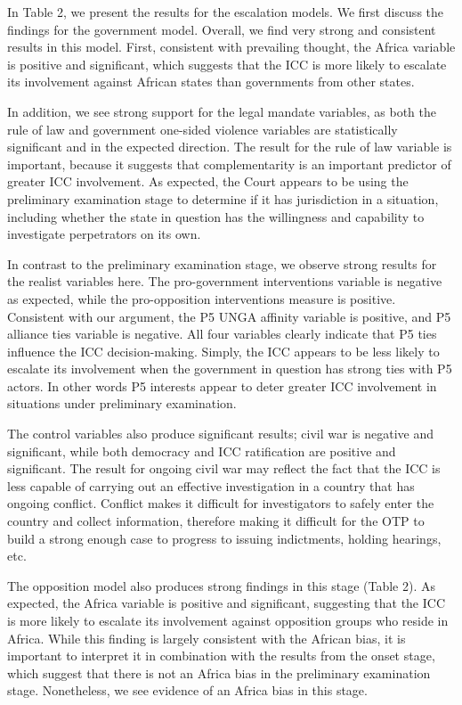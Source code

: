 In Table 2, we present the results for the escalation models. We first discuss the findings for the government model.  Overall, we find very strong and consistent results in this model.  First, consistent with prevailing thought, the Africa variable is positive and significant, which suggests that the ICC is more likely to escalate its involvement against African states than governments from other states. 

In addition, we see strong support for the legal mandate variables, as both the rule of law and government one-sided violence variables are statistically significant and in the expected direction. The result for the rule of law variable is important, because it suggests that complementarity is an important predictor of greater ICC involvement. As expected, the Court appears to be using the preliminary examination stage to determine if it has jurisdiction in a situation, including whether the state in question has the willingness and capability to investigate perpetrators on its own. 

In contrast to the preliminary examination stage, we observe strong results for the realist variables here.  The pro-government interventions variable is negative as expected, while the pro-opposition interventions measure is positive.  Consistent with our argument, the P5 UNGA affinity variable is positive, and P5 alliance ties variable is negative. All four variables clearly indicate that P5 ties influence the ICC decision-making.  Simply, the ICC appears to be less likely to escalate its involvement when the government in question has strong ties with P5 actors.  In other words P5 interests appear to deter greater ICC involvement in situations under preliminary examination. 

The control variables also produce significant results; civil war is negative and significant, while both democracy and ICC ratification are positive and significant. The result for ongoing civil war may reflect the fact that the ICC is less capable of carrying out an effective investigation in a country that has ongoing conflict.  Conflict makes it difficult for investigators to safely enter the country and collect information, therefore making it difficult for the OTP to build a strong enough case to progress to issuing indictments, holding hearings, etc. 

The opposition model also produces strong findings in this stage (Table 2). As expected, the Africa variable is positive and significant, suggesting that the ICC is more likely to escalate its involvement against opposition groups who reside in Africa. While this finding is largely consistent with the African bias, it is important to interpret it in combination with the results from the onset stage, which suggest that there is not an Africa bias in the preliminary examination stage.  Nonetheless, we see evidence of an Africa bias in this stage.

